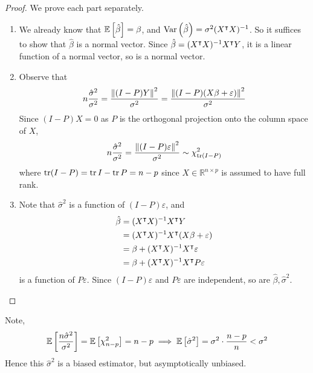 \begin{proof}
	We prove each part separately.
	\begin{enumerate}
		\item We already know that \( \mathbb{E}\left[{\hat \beta}\right] = \beta \), and \( \operatorname{Var}\left({\hat \beta}\right) = \sigma^2 (X^\intercal X)^{-1} \).
		      So it suffices to show that \( \hat \beta \) is a normal vector.
		      Since \( \hat \beta = (X^\intercal X)^{-1} X^\intercal Y \), it is a linear function of a normal vector, so is a normal vector.
		\item Observe that
		      \[
			      n\frac{\hat\sigma^2}{\sigma^2} = \frac{\norm{(I-P)Y}^2}{\sigma^2} = \frac{\norm{(I-P)(X\beta+\varepsilon)}^2}{\sigma^2}
		      \]
		      Since \( (I-P)X = 0 \) as \( P \) is the orthogonal projection onto the column space of \( X \),
		      \[
			      n\frac{\hat\sigma^2}{\sigma^2} = \frac{\norm{(I-P)\varepsilon}^2}{\sigma^2} \sim \chi^2_{\tr (I-P)}
		      \]
		      where \( \tr (I-P) = \tr I - \tr P = n - p \) since \( X \in \mathbb R^{n \times p} \) is assumed to have full rank.
		\item Note that \( \hat \sigma^2 \) is a function of \( (I-P)\varepsilon \), and
		      \begin{align*}
			      \hat\beta & = (X^\intercal X)^{-1} X^\intercal Y                    \\
			                & = (X^\intercal X)^{-1} X^\intercal (X\beta+\varepsilon) \\
			                & = \beta + (X^\intercal X)^{-1} X^\intercal \varepsilon  \\
			                & = \beta + (X^\intercal X)^{-1} X^\intercal P\varepsilon
		      \end{align*}
		      is a function of \( P\varepsilon \).
		      Since \( (I-P)\varepsilon \) and \( P \varepsilon \) are independent, so are \( \hat \beta, \hat \sigma^2 \).
	\end{enumerate}
\end{proof}
Note,
\[
	\mathbb{E}\left[{\frac{n\hat\sigma^2}{\sigma^2}}\right] = \mathbb{E}\left[{\chi^2_{n-p}}\right] = n-p \implies \mathbb{E}\left[{\hat\sigma^2}\right] = \sigma^2 \cdot \frac{n-p}{n} < \sigma^2
\]
Hence this \( \hat \sigma^2 \) is a biased estimator, but asymptotically unbiased.

